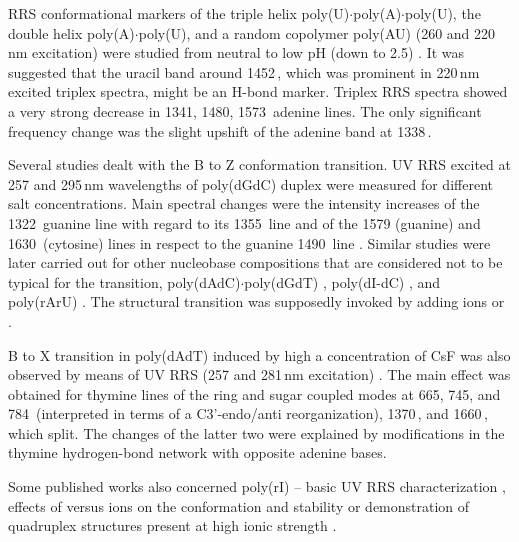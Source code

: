 RRS conformational markers of the triple helix
poly(U)$\cdot$poly(A)$\cdot$poly(U), the double helix poly(A)$\cdot$poly(U),
and a random copolymer poly(AU) (260 and 220\,nm excitation) were studied from
neutral to low pH (down to 2.5)
\parencite{Gfrorer1993a}.
It was suggested that the uracil band around 1452\,\icm{}, which was prominent
in 220\,nm excited triplex spectra, might be an H-bond marker.
Triplex RRS spectra showed a very strong decrease in 1341, 1480, 1573\,\icm{}
adenine lines.
The only significant frequency change was the slight upshift of the adenine
band at 1338\,\icm{}.

Several studies dealt with the B to Z conformation transition.
UV RRS excited at 257 and 295\,nm wavelengths of poly(dGdC) duplex were
measured for different salt concentrations.
Main spectral changes were the intensity increases of the 1322\,\icm{} guanine
line with regard to its 1355\,\icm{} line and of the 1579 (guanine) and
1630\,\icm{} (cytosine) lines in respect to the guanine 1490\,\icm{} line
\parencite{Jolles1984}.
Similar studies were later carried out for other nucleobase compositions that
are considered not to be typical for the transition,
poly(dAdC)$\cdot$poly(dGdT)
\parencite{Miskovsky1992},
poly(dI-dC)
\parencite{Tomkova1993},
and poly(rArU)
\parencite{Tomkova1994}.
The structural transition was supposedly invoked by adding  ions or
.

B to X transition in poly(dAdT) induced by high a concentration of CsF was also
observed by means of UV RRS (257 and 281\,nm excitation)
\parencite{Tomkova1995}.
The main effect was obtained for thymine lines of the ring and sugar coupled
modes at 665, 745, and 784\,\icm{} (interpreted in terms of a C3'-endo/anti
reorganization), 1370\,\icm{}, and 1660\,\icm{}, which split.
The changes of the latter two were explained by modifications in the thymine
 hydrogen-bond network with opposite adenine bases.

Some published works also concerned poly(rI) -- basic UV RRS characterization
\parencite{Ulicny1994},
effects of  versus  ions on the conformation and stability
\parencite{Mukerji1998}
or demonstration of quadruplex structures present at high ionic strength
\parencite{Wheeler1996}.
